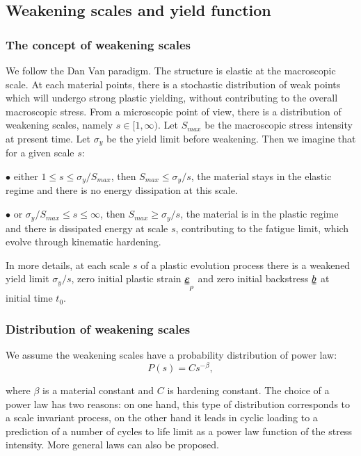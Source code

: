 \documentclass[3p,times,procedia,number]{elsarticle}
\begin{document}
\subsection{Weakening scales and yield function}
\subsubsection{The concept of weakening scales} 

We follow the Dan Van paradigm. The structure is elastic at the macroscopic scale. At each material points, there is a stochastic distribution of weak points which will undergo strong plastic yielding, without contributing to the overall macroscopic stress. From a microscopic point of view, there is a distribution of weakening scales, namely $s\in[1,\infty)$. Let $S_{max}$ be the macroscopic stress intensity at present time. Let $\sigma_y$ be the yield limit before weakening. Then we imagine that for a given scale $s$:

\vspace{6pt}
\noindent
$\bullet$ either $1\leqslant s\leqslant \sigma_y/S_{max}$, then $S_{max}\leqslant \sigma_y/s$, the material stays in the elastic regime and there is no energy dissipation at this scale.

\vspace{6pt}
\noindent
$\bullet$ or $\sigma_y/S_{max}\leqslant s\leqslant \infty$, then $S_{max}\geqslant \sigma_y/s$, the material is in the plastic regime and there is dissipated energy at scale $s$, contributing to the fatigue limit, which evolve through kinematic hardening.

In more details, at each scale $s$ of a plastic evolution process there is a weakened yield limit $\sigma_y/s$, zero initial plastic strain $\uuline{\varepsilon}_p$ and zero initial backstress $\uuline{b}$ at initial time $t_0$.


\vspace{6pt}

\subsubsection{Distribution of weakening scales}

We assume the weakening scales have a  probability distribution of power law: 
$$P(s) = Cs^{-\beta},$$

where $\beta$ is a material constant and $C$ is hardening constant. 
The choice of a power law has two reasons: on one hand, this type of distribution corresponds to a scale invariant process, on the other hand it leads in cyclic loading to a prediction of a number of cycles to life limit as a power law function of the stress intensity. More general laws can also be proposed.
\end{document}
